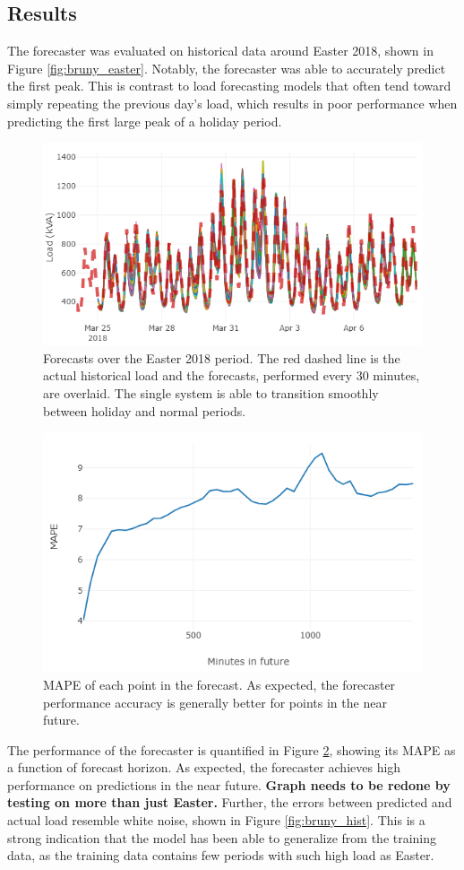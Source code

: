 \documentclass[conference]{IEEEtran}
\begin{document}
\subsection{Results}

The forecaster was evaluated on historical data around Easter 2018, shown in Figure \ref{fig:bruny_easter}.
Notably, the forecaster was able to accurately predict the first peak.
This is contrast to load forecasting models that often tend toward simply repeating the previous day's load, which results in poor performance when predicting the first large peak of a holiday period.


\begin{figure}[htbp]
	\centerline{\includegraphics[width=.35\textwidth]{images/easter_2018_all_forecast.png}}
	\caption{Forecasts over the Easter 2018 period.
		The red dashed line is the actual historical load and the forecasts, performed every 30 minutes, are overlaid.
		The single system is able to transition smoothly between holiday and normal periods.}
	\label{fig:easter_forecasts}
\end{figure}

\begin{figure}[htbp]
	\centerline{\includegraphics[width=.35\textwidth]{images/bruny_mape.png}}
	\caption{MAPE of each point in the forecast.
		     As expected, the forecaster performance accuracy is generally better for points in the near future.}
	\label{fig:bruny_mape}
\end{figure}

The performance of the forecaster is quantified in Figure \ref{fig:bruny_mape}, showing its MAPE as a function of forecast horizon.
As expected, the forecaster achieves high performance on predictions in the near future.
\textbf{Graph needs to be redone by testing on more than just Easter.}
Further, the errors between predicted and actual load resemble white noise, shown in Figure \ref{fig:bruny_hist}.
This is a strong indication that the model has been able to generalize from the training data, as the training data contains few periods with such high load as Easter.
\end{document}
